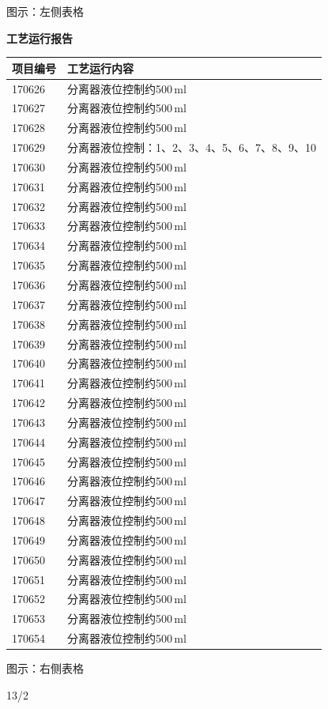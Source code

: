 \documentclass[UTF8,10pt,a4paper,fontset=fandol]{ctexart}
\newcommand{\handwritten}[1]{#1}
\begin{document}
\begin{center}
\begin{minipage}[t]{0.47\textwidth}
\medskip
\scriptsize
图示：左侧表格
\end{minipage}
\hfill
\begin{minipage}[t]{0.47\textwidth}
\centering
\textbf{工艺运行报告}

\smallskip
\begin{tabularx}{\textwidth}{|p{}|X|}
\hline
\textbf{项目编号} & \textbf{工艺运行内容} \\ \hline
170626 & 分离器液位控制约500\,ml \\ \hline
170627 & 分离器液位控制约500\,ml \\ \hline
170628 & 分离器液位控制约500\,ml \\ \hline
170629 & 分离器液位控制：1、2、3、4、5、6、7、8、9、10 \\ \hline
170630 & 分离器液位控制约500\,ml \\ \hline
170631 & 分离器液位控制约500\,ml \\ \hline
170632 & 分离器液位控制约500\,ml \\ \hline
170633 & 分离器液位控制约500\,ml \\ \hline
170634 & 分离器液位控制约500\,ml \\ \hline
170635 & 分离器液位控制约500\,ml \\ \hline
170636 & 分离器液位控制约500\,ml \\ \hline
170637 & 分离器液位控制约500\,ml \\ \hline
170638 & 分离器液位控制约500\,ml \\ \hline
170639 & 分离器液位控制约500\,ml \\ \hline
170640 & 分离器液位控制约500\,ml \\ \hline
170641 & 分离器液位控制约500\,ml \\ \hline
170642 & 分离器液位控制约500\,ml \\ \hline
170643 & 分离器液位控制约500\,ml \\ \hline
170644 & 分离器液位控制约500\,ml \\ \hline
170645 & 分离器液位控制约500\,ml \\ \hline
170646 & 分离器液位控制约500\,ml \\ \hline
170647 & 分离器液位控制约500\,ml \\ \hline
170648 & 分离器液位控制约500\,ml \\ \hline
170649 & 分离器液位控制约500\,ml \\ \hline
170650 & 分离器液位控制约500\,ml \\ \hline
170651 & 分离器液位控制约500\,ml \\ \hline
170652 & 分离器液位控制约500\,ml \\ \hline
170653 & 分离器液位控制约500\,ml \\ \hline
170654 & 分离器液位控制约500\,ml \\ \hline
\end{tabularx}

\medskip
\scriptsize
图示：右侧表格
\end{minipage}

\vspace{0.4cm}

\handwritten{13/2}
\end{center}
\end{document}
